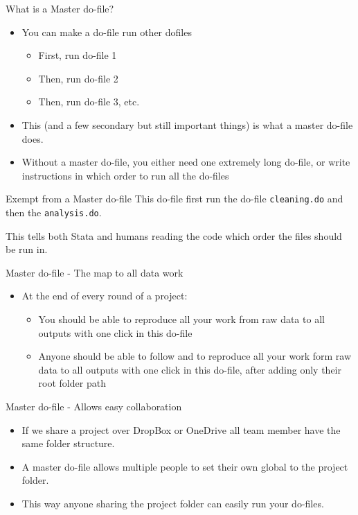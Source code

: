 \documentclass[aspectratio=169]{beamer}
\newcommand{\codeexample}[2]{
	\begin{figure}
		\VerbatimInput[
		framesep=3mm,
		frame=lines, %
		numbers=left, %
		label= #1, %
		baselinestretch=0.90, %
		]{#2} %
	\end{figure}
	\FloatBarrier
}
\begin{document}
\begin{frame}{What is a Master do-file?}
	\begin{itemize}
		\item You can make a do-file run other dofiles
			\begin{itemize}
				\item First, run do-file 1
				\item Then, run do-file 2 
				\item Then, run do-file 3, etc.
			\end{itemize}
		\item This (and a few secondary but still important things) is what a master do-file does.
		\item Without a master do-file, you either need one extremely long do-file, or write instructions in which order to run all the do-files
	\end{itemize}
\end{frame}

\begin{frame}{Exempt from a Master do-file}
	This do-file first run the do-file \texttt{cleaning.do} and then the \texttt{analysis.do}.
		\codeexample{run-do-from-do.do}{code/run-do-from-do.do}
	This tells both Stata and humans reading the code which order the files should be run in.
\end{frame}


\begin{frame}{Master do-file - The map to all data work}
	\begin{itemize}
		\item At the end of every round of a project:
		\begin{itemize}
			\item 	You should be able to reproduce all your work from raw data to all outputs with one click in this do-file
			\item Anyone should be able to follow and to reproduce all your work form raw data to all outputs with one click in this do-file, after adding only their root folder path
		\end{itemize}
	\end{itemize}
\end{frame}

\begin{frame}[fragile]{Master do-file - Allows easy collaboration}	
	\begin{itemize}
		\item If we share a project over DropBox or OneDrive all team member have the same folder structure.
		\item A master do-file allows multiple people to set their own global to the project folder.
		\item This way anyone sharing the project folder can easily run your do-files.
	\end{itemize}
\end{frame}
\end{document}
